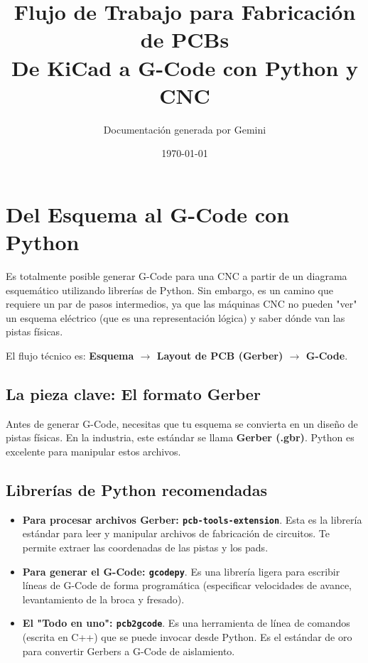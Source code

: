 \documentclass[12pt, a4paper]{article}
\title{\textbf{Flujo de Trabajo para Fabricación de PCBs}\\ \large De KiCad a G-Code con Python y CNC}
\author{Documentación generada por Gemini}
\date{\today}
\begin{document}
\maketitle
\tableofcontents
\newpage

\section{Del Esquema al G-Code con Python}

Es totalmente posible generar G-Code para una CNC a partir de un diagrama esquemático utilizando librerías de Python. Sin embargo, es un camino que requiere un par de pasos intermedios, ya que las máquinas CNC no pueden "ver" un esquema eléctrico (que es una representación lógica) y saber dónde van las pistas físicas.

El flujo técnico es: \textbf{Esquema $\rightarrow$ Layout de PCB (Gerber) $\rightarrow$ G-Code}.

\subsection{La pieza clave: El formato Gerber}

Antes de generar G-Code, necesitas que tu esquema se convierta en un diseño de pistas físicas. En la industria, este estándar se llama \textbf{Gerber (.gbr)}. Python es excelente para manipular estos archivos.

\subsection{Librerías de Python recomendadas}

\begin{itemize}
    \item \textbf{Para procesar archivos Gerber: \texttt{pcb-tools-extension}}. Esta es la librería estándar para leer y manipular archivos de fabricación de circuitos. Te permite extraer las coordenadas de las pistas y los pads.
    \item \textbf{Para generar el G-Code: \texttt{gcodepy}}. Es una librería ligera para escribir líneas de G-Code de forma programática (especificar velocidades de avance, levantamiento de la broca y fresado).
    \item \textbf{El "Todo en uno": \texttt{pcb2gcode}}. Es una herramienta de línea de comandos (escrita en C++) que se puede invocar desde Python. Es el estándar de oro para convertir Gerbers a G-Code de aislamiento.
\end{itemize}
\end{document}
